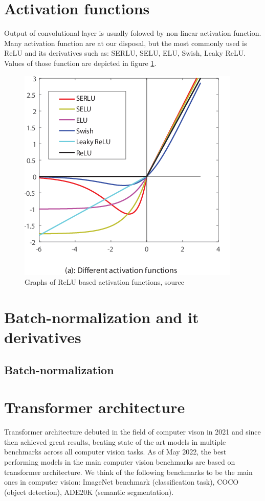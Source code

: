 \section{Activation functions}
Output of convolutional layer is usually folowed by non-linear activation function. Many activation function are at our disposal, but the most commonly used is ReLU and its derivatives such as: SERLU, SELU, ELU, Swish, Leaky ReLU. Values of those function are depicted in figure \ref{fig:activation_functions}.

\begin{figure}
    \centering
    \includegraphics[width=0.6\linewidth]{images/activation_functions.png}
    \caption{Graphs of ReLU based activation functions, source \cite{Zhang2018}}
    \label{fig:activation_functions}
\end{figure}

\section{Batch-normalization and it derivatives}
\subsection{Batch-normalization}


\section{Transformer architecture}
Transformer architecture debuted in the field of computer vison in 2021 and since then achieved great results, beating state of the art models in multiple benchmarks across all computer vision tasks. As of May 2022, the best performing models in the main computer vision benchmarks are based on transformer architecture. We think of the following benchmarks to be the main ones in computer vision:  ImageNet benchmark (classification task), COCO (object detection), ADE20K (semantic segmentation).

